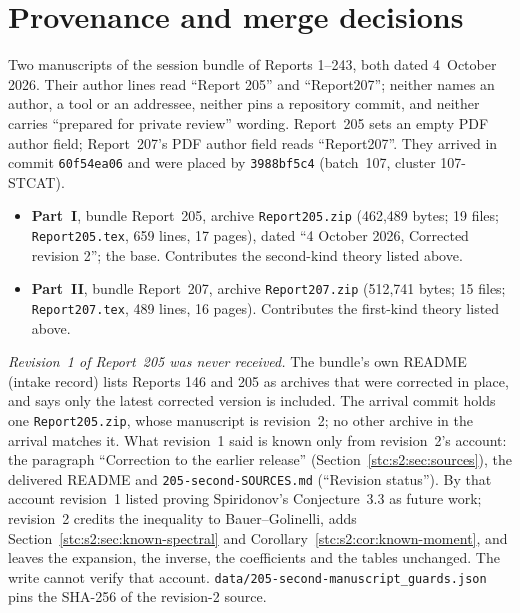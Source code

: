 \documentclass[11pt,letterpaper]{article}
\numberwithin{equation}{section}
\theoremstyle{remark}\newtheorem{remark}[theorem]{Remark}
\newcommand{\file}[1]{\nolinkurl{#1}}
\begin{document}
\section*{Provenance and merge decisions}\label{stc:sec:provenance}
Two manuscripts of the session bundle of Reports 1--243, both dated 4~October 2026. Their author lines read ``Report 205'' and ``Report207''; neither names an author, a tool or an addressee, neither pins a repository commit, and neither carries ``prepared for private review'' wording. Report~205 sets an empty PDF author field; Report~207's PDF author field reads ``Report207''. They arrived in commit \texttt{60f54ea06} and were placed by \texttt{3988bf5c4} (batch~107, cluster 107-STCAT).
\begin{itemize}
\item \textbf{Part~I}, bundle Report~205, archive \file{Report205.zip} (462,489 bytes; 19 files; \file{Report205.tex}, 659 lines, 17 pages), dated ``4 October 2026, Corrected revision 2''; the base. Contributes the second-kind theory listed above.
\item \textbf{Part~II}, bundle Report~207, archive \file{Report207.zip} (512,741 bytes; 15 files; \file{Report207.tex}, 489 lines, 16 pages). Contributes the first-kind theory listed above.
\end{itemize}
\emph{Revision~1 of Report~205 was never received.} The bundle's own README (intake record) lists Reports 146 and 205 as archives that were corrected in place, and says only the latest corrected version is included. The arrival commit holds one \file{Report205.zip}, whose manuscript is revision~2; no other archive in the arrival matches it. What revision~1 said is known only from revision~2's account: the paragraph ``Correction to the earlier release'' (Section~\ref{stc:s2:sec:sources}), the delivered README and \file{205-second-SOURCES.md} (``Revision status''). By that account revision~1 listed proving Spiridonov's Conjecture~3.3 as future work; revision~2 credits the inequality to Bauer--Golinelli, adds Section~\ref{stc:s2:sec:known-spectral} and Corollary~\ref{stc:s2:cor:known-moment}, and leaves the expansion, the inverse, the coefficients and the tables unchanged. The write cannot verify that account. \file{data/205-second-manuscript_guards.json} pins the SHA-256 of the revision-2 source.
\end{document}
